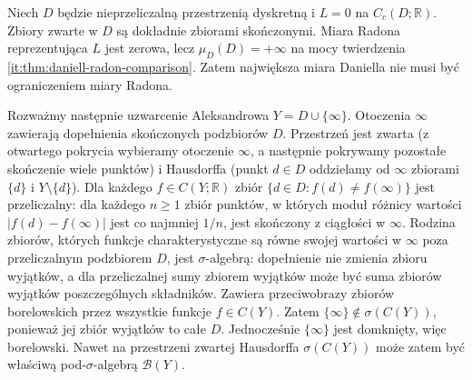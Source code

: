 \begin{przyklad}
\label{it:ex:radon-baire-daniell}
Niech $D$ będzie nieprzeliczalną przestrzenią dyskretną
i $L=0$ na $C_c(D;\mathbb R)$. Zbiory zwarte w $D$
są dokładnie zbiorami skończonymi. Miara Radona
reprezentująca $L$ jest zerowa, lecz $\mu_D(D)=+\infty$
na mocy twierdzenia \ref{it:thm:daniell-radon-comparison}.
Zatem największa miara Daniella nie musi być
ograniczeniem miary Radona.

Rozważmy następnie uzwarcenie Aleksandrowa
$Y=D\cup\{\infty\}$. Otoczenia $\infty$ zawierają
dopełnienia skończonych podzbiorów $D$.
Przestrzeń jest zwarta (z otwartego pokrycia wybieramy
otoczenie $\infty$, a następnie pokrywamy pozostałe
skończenie wiele punktów) i Hausdorffa (punkt $d\in D$
oddzielamy od $\infty$ zbiorami $\{d\}$ i $Y\setminus\{d\}$).
Dla każdego $f\in C(Y;\mathbb R)$ zbiór
$\{d\in D:f(d)\ne f(\infty)\}$ jest przeliczalny:
dla każdego $n\ge1$ zbiór punktów, w których moduł
różnicy wartości $|f(d)-f(\infty)|$ jest co najmniej
$1/n$, jest skończony z ciągłości w $\infty$.
Rodzina zbiorów, których funkcje charakterystyczne
są równe swojej wartości w $\infty$ poza przeliczalnym
podzbiorem $D$, jest $\sigma$-algebrą: dopełnienie
nie zmienia zbioru wyjątków, a dla przeliczalnej sumy
zbiorem wyjątków może być suma zbiorów wyjątków
poszczególnych składników. Zawiera przeciwobrazy
zbiorów borelowskich przez wszystkie funkcje $f\in C(Y)$.
Zatem $\{\infty\}\notin\sigma(C(Y))$, ponieważ
jej zbiór wyjątków to całe $D$. Jednocześnie
$\{\infty\}$ jest domknięty, więc borelowski.
Nawet na przestrzeni zwartej Hausdorffa
$\sigma(C(Y))$ może zatem być właściwą
pod-$\sigma$-algebrą $\mathcal B(Y)$.
\end{przyklad}

